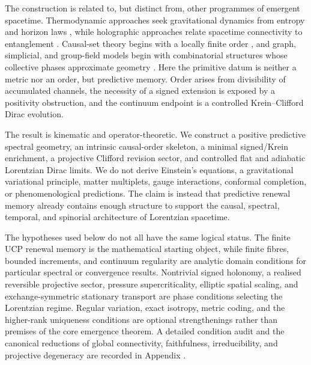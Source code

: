 \documentclass[11pt]{article}
\theoremstyle{definition}
\theoremstyle{remark}
\begin{document}
The construction is related to, but distinct from, other programmes of
emergent spacetime.  Thermodynamic approaches seek gravitational dynamics
from entropy and horizon laws \cite{jacobson1995,verlinde2011}, while
holographic approaches relate spacetime connectivity to entanglement
\cite{vanraamsdonk2010}.  Causal-set theory begins with a locally finite order
\cite{bombelli-sorkin,surya}, and graph, simplicial, and group-field models
begin with combinatorial structures whose collective phases approximate
geometry
\cite{konopkamarkopouloseverini2008,
ambjornjurkiewiczloll2009,oriti2009}.  Here the primitive datum is neither a
metric nor an order, but predictive memory.  Order arises from divisibility
of accumulated channels, the necessity of a signed extension is exposed by
a positivity obstruction, and the continuum endpoint is a controlled
Krein--Clifford Dirac evolution.

The result is kinematic and operator-theoretic.  We construct a positive
predictive spectral geometry, an intrinsic causal-order skeleton, a minimal
signed/Krein enrichment, a projective Clifford revision sector, and
controlled flat and adiabatic Lorentzian Dirac limits.  We do not derive
Einstein's equations, a gravitational variational principle, matter
multiplets, gauge interactions, conformal completion, or phenomenological
predictions.  The claim is instead that predictive renewal memory already
contains enough structure to support the causal, spectral, temporal, and
spinorial architecture of Lorentzian spacetime.

The hypotheses used below do not all have the same logical status.  The finite UCP
renewal memory is the mathematical starting object, while finite fibres, bounded
increments, and continuum regularity are analytic domain conditions for particular
spectral or convergence results.  Nontrivial signed holonomy, a realised reversible
projective sector, pressure supercriticality, elliptic spatial scaling, and
exchange-symmetric stationary transport are phase conditions selecting the
Lorentzian regime.  Regular variation, exact isotropy, metric coding, and the
higher-rank uniqueness conditions are optional strengthenings rather than premises
of the core emergence theorem.  A detailed condition audit and the canonical
reductions of global connectivity, faithfulness, irreducibility, and projective
degeneracy are recorded in Appendix .
\end{document}
